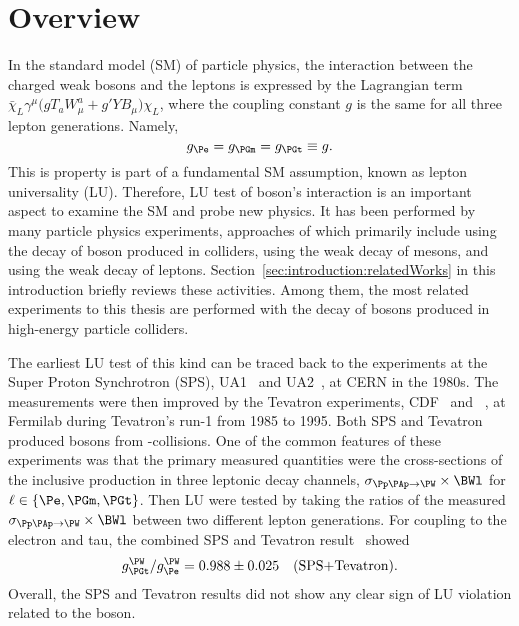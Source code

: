
\section{Overview}
\label{sec:introduction:overview}

In the standard model (SM) of particle physics, the interaction between the charged weak bosons and the leptons is expressed by the Lagrangian term $\bar{\chi}_L \gamma^\mu \big( g T_a W^a_\mu +g'Y B_\mu \big) \chi_L $, where the coupling constant $g$ is the same for all three lepton generations. Namely,
\begin{equation*}
	g_\Pe = g_\PGm = g_\PGt \equiv g.
\end{equation*}
\noindent This is property is part of a fundamental SM assumption, known as lepton universality (LU). Therefore, LU test of \PW boson's interaction is an important aspect to examine the SM and probe new physics. It has been performed by many particle physics experiments, approaches of which primarily include using the decay of \PW boson produced in colliders, using the weak decay of mesons, and using the weak decay of leptons. Section~\ref{sec:introduction:relatedWorks} in this introduction briefly reviews these activities. Among them, the most related experiments to this thesis are performed with the decay of \PW bosons produced in high-energy particle colliders.


The earliest LU test of this kind can be traced back to the experiments at the Super Proton Synchrotron (SPS), UA1~\cite{Albajar:1988ka} and UA2~\cite{appel1986measurement, Alitti:1991eh, Alitti:1992hv}, at CERN in the 1980s. The measurements were then improved by the Tevatron experiments, CDF~\cite{Abazov:2003sv,Abe:1990sd,Abe:1992ys, Abe:1991fb} and \DZERO~\cite{ Abbott:1999tt, Abachi:1995xc, Abbott:1999pk}, at Fermilab during Tevatron's run-1 from 1985 to 1995. Both SPS and Tevatron produced \PW bosons from \Pp-\PAp collisions. One of the common features of these experiments was that the primary measured quantities were the cross-sections of the inclusive \PW production in three \PW leptonic decay channels, $\sigma_{\Pp\PAp \to \PW} \times \BWl$ for $\ell \in \{\Pe,\PGm, \PGt \}$. Then LU were tested by taking the ratios of the measured $\sigma_{\Pp\PAp \to \PW} \times \BWl$ between two different lepton generations. For \PW coupling to the electron and tau, the combined SPS and Tevatron result~\cite{Abbott:1999pk} showed
\begin{equation*}
    g^\PW_\PGt / g^\PW_\Pe = 0.988 \pm 0.025 \quad \text{(SPS+Tevatron)}.
\end{equation*}
\noindent Overall, the SPS and Tevatron results did not show any clear sign of LU violation related to the \PW boson. 



